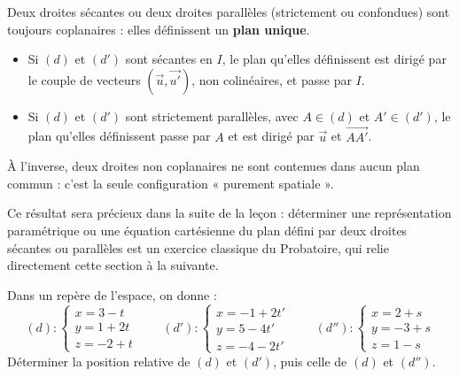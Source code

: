 \documentclass[11pt]{article}
\newcommand{\cle}[1]{{\popxbold\color{popdark}#1}}
\begin{document}
\begin{aretenir}
Deux droites \cle{sécantes} ou deux droites \cle{parallèles} (strictement ou confondues) sont toujours coplanaires : elles définissent un \textbf{plan unique}.
\begin{itemize}
\item Si $(d)$ et $(d')$ sont sécantes en $I$, le plan qu'elles définissent est dirigé par le couple de vecteurs $(\vec{u}, \vec{u'})$, non colinéaires, et passe par $I$.
\item Si $(d)$ et $(d')$ sont strictement parallèles, avec $A \in (d)$ et $A' \in (d')$, le plan qu'elles définissent passe par $A$ et est dirigé par $\vec{u}$ et $\overrightarrow{AA'}$.
\end{itemize}
À l'inverse, deux droites \cle{non coplanaires} ne sont contenues dans aucun plan commun : c'est la seule configuration « purement spatiale ».
\end{aretenir}

Ce résultat sera précieux dans la suite de la leçon : déterminer une représentation paramétrique ou une équation cartésienne du plan défini par deux droites sécantes ou parallèles est un exercice classique du Probatoire, qui relie directement cette section à la suivante.

\begin{exercice}
Dans un repère de l'espace, on donne :
\[ (d) : \begin{cases} x = 3 - t \\ y = 1 + 2t \\ z = -2 + t \end{cases} \qquad (d') : \begin{cases} x = -1 + 2t' \\ y = 5 - 4t' \\ z = -4 - 2t' \end{cases} \qquad (d'') : \begin{cases} x = 2 + s \\ y = -3 + s \\ z = 1 - s \end{cases} \]
Déterminer la position relative de $(d)$ et $(d')$, puis celle de $(d)$ et $(d'')$.
\end{exercice}
\end{document}

